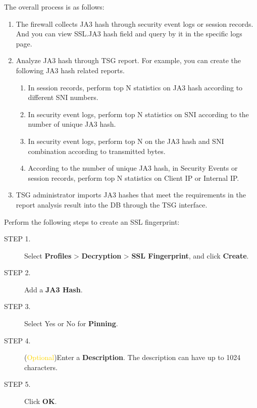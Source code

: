 The overall process is as follows:

\begin{description}[leftmargin=0pt]
    \item
    \begin{enumerate}
        \setlength{\topsep}{0pt}
        \item The firewall collects JA3 hash through security event logs or session records. And you can view SSL.JA3 hash field and query by it in the specific logs page. 
        \item Analyze JA3 hash through TSG report. For example, you can create the following JA3 hash related reports. 
        \begin{enumerate}
            \item  In session records, perform top N statistics on JA3 hash according to different SNI numbers.
            \item  In security event logs, perform top N statistics on SNI according to the number of unique JA3 hash.
            \item  In security event logs, perform top N on the JA3 hash and SNI combination according to transmitted bytes.
            \item  According to the number of unique JA3 hash, in Security Events or session records, perform top N statistics on Client IP or Internal IP.
        \end{enumerate}
        \item TSG administrator imports JA3 hashes that meet the requirements in the report analysis result into the DB through the TSG interface.
    \end{enumerate}
\end{description} 

Perform the following steps to create an SSL fingerprint:

\begin{description}
    \item[STEP 1.]	Select \textbf{Profiles} > \textbf{Decryption} > \textbf{SSL Fingerprint}, and click \textbf{Create}.
    \item[STEP 2.]	Add a \textbf{JA3 Hash}. 
    \item[STEP 3.]	Select Yes or No for \textbf{Pinning}.
    \item[STEP 4.]	(\textcolor{gold}{Optional})Enter a \textbf{Description}. The description can have up to 1024 characters. 
    \item[STEP 5.]	Click \textbf{OK}.
\end{description} 

